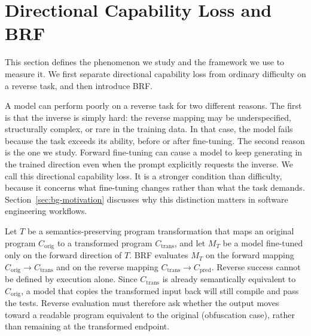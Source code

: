 \section{Directional Capability Loss and BRF}
\label{sec:theorical}



This section defines the phenomenon we study and the framework we use to measure it.
We first separate directional capability loss from ordinary difficulty on a reverse task, and then introduce BRF.

A model can perform poorly on a reverse task for two different reasons.
The first is that the inverse is simply hard: the reverse mapping may be underspecified, structurally complex, or rare in the training data.
In that case, the model fails because the task exceeds its ability, before or after fine-tuning.
The second reason is the one we study.
Forward fine-tuning can cause a model to keep generating in the trained direction even when the prompt explicitly requests the inverse.
We call this directional capability loss.
It is a stronger condition than difficulty, because it concerns what fine-tuning changes rather than what the task demands.
Section~\ref{sec:bg-motivation} discusses why this distinction matters in software engineering workflows.

Let $T$ be a semantics-preserving program transformation that maps an original
program $C_{\text{orig}}$ to a transformed program $C_{\text{trans}}$, and let
$M_T$ be a model fine-tuned only on the forward direction of $T$. BRF evaluates
$M_T$ on the forward mapping $C_{\text{orig}} \rightarrow C_{\text{trans}}$ and on
the reverse mapping $C_{\text{trans}} \rightarrow C_{\text{pred}}$. Reverse
success cannot be defined by execution alone. Since $C_{\text{trans}}$ is already
semantically equivalent to $C_{\text{orig}}$, a model that copies the transformed
input back will still compile and pass the tests. Reverse evaluation must
therefore ask whether the output moves toward a readable program equivalent to
the original (obfuscation case), rather than remaining at the transformed endpoint.


